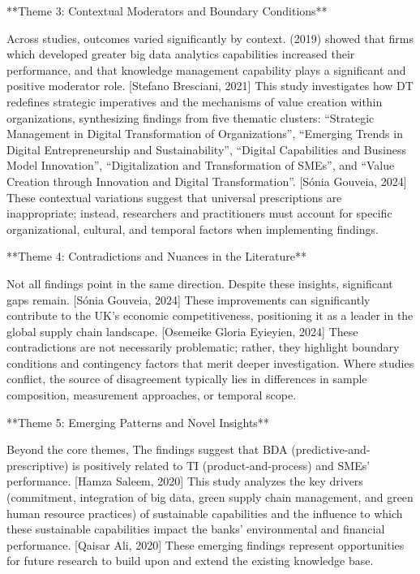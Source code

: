 \documentclass[11pt, a4paper]{article}
\begin{document}
**Theme 3: Contextual Moderators and Boundary Conditions**

Across studies, outcomes varied significantly by context. (2019) showed that firms which developed greater big data analytics capabilities increased their performance, and that knowledge management capability plays a significant and positive moderator role. [Stefano Bresciani, 2021] This study investigates how DT redefines strategic imperatives and the mechanisms of value creation within organizations, synthesizing findings from five thematic clusters: “Strategic Management in Digital Transformation of Organizations”, “Emerging Trends in Digital Entrepreneurship and Sustainability”, “Digital Capabilities and Business Model Innovation”, “Digitalization and Transformation of SMEs”, and “Value Creation through Innovation and Digital Transformation”. [Sónia Gouveia, 2024] These contextual variations suggest that universal prescriptions are inappropriate; instead, researchers and practitioners must account for specific organizational, cultural, and temporal factors when implementing findings.

**Theme 4: Contradictions and Nuances in the Literature**

Not all findings point in the same direction. Despite these insights, significant gaps remain. [Sónia Gouveia, 2024] These improvements can significantly contribute to the UK's economic competitiveness, positioning it as a leader in the global supply chain landscape. [Osemeike Gloria Eyieyien, 2024] These contradictions are not necessarily problematic; rather, they highlight boundary conditions and contingency factors that merit deeper investigation. Where studies conflict, the source of disagreement typically lies in differences in sample composition, measurement approaches, or temporal scope.

**Theme 5: Emerging Patterns and Novel Insights**

Beyond the core themes, The findings suggest that BDA (predictive-and-prescriptive) is positively related to TI (product-and-process) and SMEs’ performance. [Hamza Saleem, 2020] This study analyzes the key drivers (commitment, integration of big data, green supply chain management, and green human resource practices) of sustainable capabilities and the influence to which these sustainable capabilities impact the banks’ environmental and financial performance. [Qaisar Ali, 2020] These emerging findings represent opportunities for future research to build upon and extend the existing knowledge base.
\end{document}
